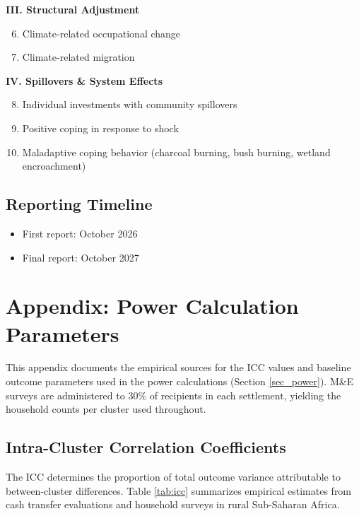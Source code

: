 \documentclass[12pt, oneside]{amsart}
\numberwithin{equation}{section}
\begin{document}
\noindent\textbf{III. Structural Adjustment}
\begin{enumerate}
    \setcounter{enumi}{5}
    \item Climate-related occupational change
    \item Climate-related migration
\end{enumerate}

\noindent\textbf{IV. Spillovers \& System Effects}
\begin{enumerate}
    \setcounter{enumi}{7}
    \item Individual investments with community spillovers
    \item Positive coping in response to shock
    \item Maladaptive coping behavior (charcoal burning, bush burning, wetland encroachment)
\end{enumerate}

\subsection{Reporting Timeline}

\begin{itemize}
    \item First report: October 2026
    \item Final report: October 2027
\end{itemize}

\section{\label{sec_appendix_params}Appendix: Power Calculation Parameters}

This appendix documents the empirical sources for the ICC values and baseline outcome parameters used in the power calculations (Section \ref{sec_power}). M\&E surveys are administered to 30\% of recipients in each settlement, yielding the household counts per cluster used throughout.

\subsection{Intra-Cluster Correlation Coefficients}

The ICC determines the proportion of total outcome variance attributable to between-cluster differences. Table \ref{tab:icc} summarizes empirical estimates from cash transfer evaluations and household surveys in rural Sub-Saharan Africa.
\end{document}
